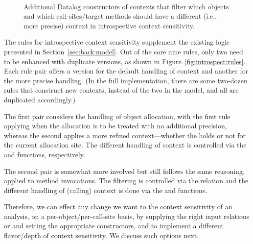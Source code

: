 \begin{figure}[htp]
\begin{datalog}
 \\
\end{datalog}
\caption[Additional Datalog constructors of contexts]{Additional Datalog constructors of contexts that filter which objects and which call-sites/target methods should have a different (i.e., more precise) context in introspective context sensitivity.}
\label{fig:introspect:output}
\end{figure}

The rules for introspective context sensitivity supplement the existing logic presented in Section~\ref{sec:back:model}. Out of the core nine rules, only two need to be enhanced with duplicate versions, as shown in Figure~\ref{fig:introspect:rules}. Each rule pair offers a version for the default handling of context and another for the more precise handling. (In the full implementation, there are some two-dozen rules that construct new contexts, instead of the two in the model, and all are duplicated accordingly.)

The first pair considers the handling of object allocation, with the first rule applying when the allocation is to be treated with no additional precision, whereas the second applies a more refined context---whether the  holds or not for the current allocation site. The different handling of context is controlled via the  and  functions, respectively.

The second pair is somewhat more involved but still follows the same reasoning, applied to method invocations. The filtering is controlled via the  relation and the different handling of (calling) context is done via the  and  functions.

Therefore, we can effect any change we want to the context sensitivity of an analysis, on a per-object/per-call-site basis, by supplying the right input relations  or  and setting the appropriate constructors,  and  to implement a different flavor/depth of context sensitivity. We discuss such options next.

